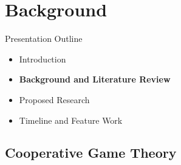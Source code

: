 \documentclass{beamer}
\begin{document}
\section{Background}
\begin{frame}{Presentation Outline}
    \begin{itemize}
     	\itemsep=.5cm
    	\item Introduction
    	\item {\bf Background and Literature Review}
    	\item Proposed Research
    	\item Timeline and Feature Work
    \end{itemize}
\end{frame}



\subsection{Cooperative Game Theory}

\end{document}
